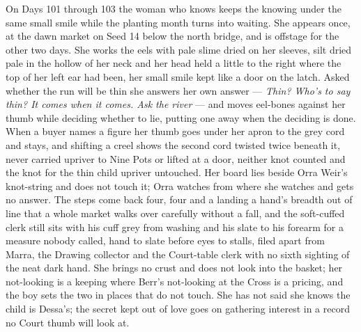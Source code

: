 \documentclass{design/chronicle}
\begin{document}
{On Days 101 through 103 the woman who knows keeps the knowing under the same small smile while the planting month turns into waiting. She appears once, at the dawn market on Seed 14 below the north bridge, and is offstage for the other two days. She works the eels with pale slime dried on her sleeves, silt dried pale in the hollow of her neck and her head held a little to the right where the top of her left ear had been, her small smile kept like a door on the latch. Asked whether the run will be thin she answers her own answer — \emph{Thin? Who’s to say thin? It comes when it comes. Ask the river} — and moves eel-bones against her thumb while deciding whether to lie, putting one away when the deciding is done. When a buyer names a figure her thumb goes under her apron to the grey cord and stays, and shifting a creel shows the second cord twisted twice beneath it, never carried upriver to Nine Pots or lifted at a door, neither knot counted and the knot for the thin child upriver untouched. Her board lies beside Orra Weir’s knot-string and does not touch it; Orra watches from where she watches and gets no answer. The steps come back four, four and a landing a hand’s breadth out of line that a whole market walks over carefully without a fall, and the soft-cuffed clerk still sits with his cuff grey from washing and his slate to his forearm for a measure nobody called, hand to slate before eyes to stalls, filed apart from Marra, the Drawing collector and the Court-table clerk with no sixth sighting of the neat dark hand. She brings no crust and does not look into the basket; her not-looking is a keeping where Berr’s not-looking at the Cross is a pricing, and the boy sets the two in places that do not touch. She has not said she knows the child is Dessa’s; the secret kept out of love goes on gathering interest in a record no Court thumb will look at.

}
\end{document}
